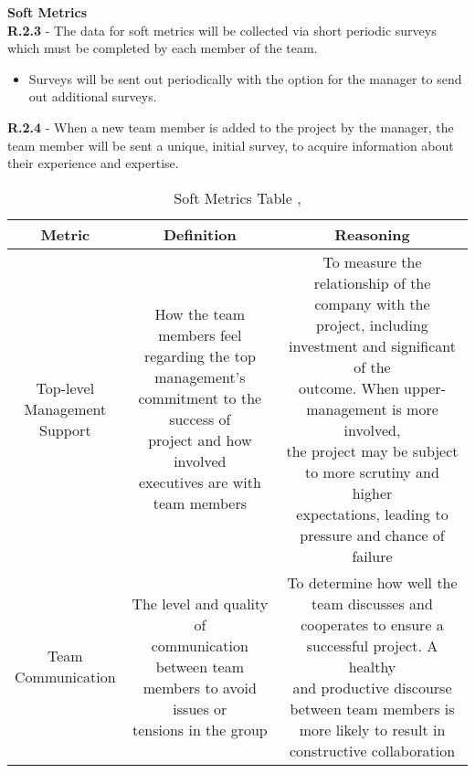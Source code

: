\documentclass[a4paper]{article}
\theoremstyle{plain}
\theoremstyle{definition}
\theoremstyle{remark}
\begin{document}
\noindent\textbf{Soft Metrics}\\

\indent \textbf{R.2.3} - The data for soft metrics will be collected via short periodic surveys which must be completed by each member of the team.\\
\vspace{-0.55cm}
\begin{itemize}
	\item Surveys will be sent out periodically with the option for the manager to send out additional surveys.
\end{itemize}
\indent \textbf{R.2.4} - When a new team member is added to the project by the manager, the team member will be sent a unique, initial survey, to acquire information about their experience and expertise. 
\begin{table}[H]
	\centering
	\caption{Soft Metrics Table \protect\cite{no}, \protect\cite{yes}}
	\label{tab:softmetric}
	\begin{tabular}{|c|c|c|}
		\hline
		\textbf{Metric} & \textbf{Definition} & \textbf{Reasoning} \\
		\hline
		\makecell{Top-level \\ Management \\ Support} & \makecell{How the team members feel \\ regarding the top management's \\ commitment to the success of \\ project and how involved \\ executives are with team members} & \makecell{To measure the relationship of the company with the \\ project, including investment and significant of the \\ outcome. When upper-management is more involved,\\ the project may be subject to more scrutiny and higher \\ expectations, leading to pressure and chance of failure} \\
		\hline
		\makecell{Team \\ Communication} & \makecell{The level and quality of \\ communication between team \\ members to avoid issues or \\ tensions in the group} & \makecell{To determine how well the team discusses and \\ cooperates to ensure a successful project. A healthy \\ and productive discourse between team members is \\ more likely to result in constructive collaboration} \\

\end{tabular}
\end{table}
\end{document}
